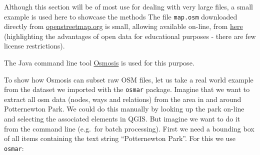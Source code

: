\documentclass[]{article}
\newenvironment{Shaded}{}{}
\newcommand{\KeywordTok}[1]{\textcolor[rgb]{0.00,0.44,0.13}{\textbf{{#1}}}}
\newcommand{\DataTypeTok}[1]{\textcolor[rgb]{0.56,0.13,0.00}{{#1}}}
\newcommand{\StringTok}[1]{\textcolor[rgb]{0.25,0.44,0.63}{{#1}}}
\newcommand{\CommentTok}[1]{\textcolor[rgb]{0.38,0.63,0.69}{\textit{{#1}}}}
\newcommand{\NormalTok}[1]{{#1}}
\begin{document}
Although this section will be of most use for dealing with very large
files, a small example is used here to showcase the methods The file
\texttt{map.osm} downloaded directly from
\href{http://www.openstreetmap.org}{openstreetmap.org} is small,
allowing available on-line, from
\href{https://github.com/Robinlovelace/osm-tutorial/blob/master/data/map.osm?raw=true}{here}
(highlighting the advantages of open data for educational purposes -
there are few license restrictions).

The Java command line tool
\href{http://wiki.openstreetmap.org/wiki/Osmosis}{Osmosis} is used for
this purpose.

To show how Osmosis can subset raw OSM files, let us take a real world
example from the dataset we imported with the \texttt{osmar} package.
Imagine that we want to extract all osm data (nodes, ways and relations)
from the area in and around Potternewton Park. We could do this manually
by looking up the park on-line and selecting the associated elements in
QGIS. But imagine we want to do it from the command line (e.g.~for batch
processing). First we need a bounding box of all items containing the
text string ``Potternewton Park''. For this we use \texttt{osmar}:

\begin{Shaded}
\end{Shaded}
\end{document}
